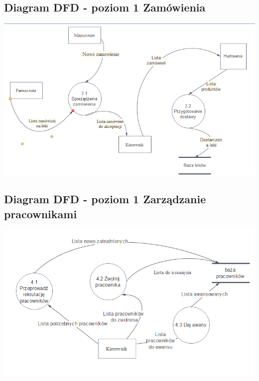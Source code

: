 \documentclass[a4paper, 11pt]{article}
\begin{document}
	\subsection{Diagram DFD - poziom 1 Zamówienia}
		\includegraphics[scale=0.9]{zamowienia.PNG} 
		
	\subsection{Diagram DFD - poziom 1 Zarządzanie pracownikami}
		\includegraphics[scale=0.6]{zarzadzaniePracownikami.PNG} 
		
\end{document}

